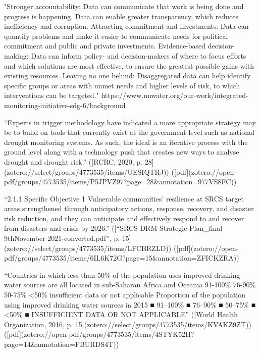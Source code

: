 "Stronger accountability: Data can communicate that work is being done and progress is happening. Data can enable greater transparency, which reduces inefficiency and corruption.
Attracting commitment and investments: Data can quantify problems and make it easier to communicate needs for political commitment and public and private investments.
Evidence-based decision-making: Data can inform policy- and decision-makers of where to focus efforts and which solutions are most effective, to ensure the greatest possible gains with existing resources.
Leaving no one behind: Disaggregated data can help identify specific groups or areas with unmet needs and higher levels of risk, to which interventions can be targeted."
https://www.unwater.org/our-work/integrated-monitoring-initiative-sdg-6/background

“Experts in trigger methodology have indicated a more appropriate strategy may be to build on tools that currently exist at the government level such as national drought monitoring systems. As such, the ideal is an iterative process with the ground level along with a technology push that creates new ways to analyse drought and drought risk.” ([RCRC, 2020, p. 28](zotero://select/groups/4773535/items/UESIQTRJ)) ([pdf](zotero://open-pdf/groups/4773535/items/P5JPVZ97?page=28&annotation=977VS8FC))

“2.1.1 Specific Objective 1 Vulnerable communities’ resilience at SRCS target areas strengthened through anticipatory actions, response, recovery, and disaster risk reduction, and they can anticipate and effectively respond to and recover from disasters and crisis by 2026.” ([“SRCS DRM Strategic Plan_final 9thNovember 2021-converted.pdf”, p. 15](zotero://select/groups/4773535/items/LFCBRZLD)) ([pdf](zotero://open-pdf/groups/4773535/items/6IL6K72G?page=15&annotation=ZFICKZRA))


“Countries in which less than 50\% of the population uses improved drinking water sources are all located in sub-Saharan Africa and Oceania 91-100\% 76-90\% 50-75\% <50\% insufficient data or not applicable Proportion of the population using improved drinking water sources in 2015 ■ 91–100\% ■ 76–90\% ■ 50–75\% ■ <50\% ■ INSUFFICIENT DATA OR NOT APPLICABLE” ([World Health Organization, 2016, p. 15](zotero://select/groups/4773535/items/KVAKZ9ZT)) ([pdf](zotero://open-pdf/groups/4773535/items/4STYK52H?page=14\&annotation=FBURDS4T))

